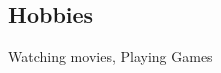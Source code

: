 \documentclass[../main.tex]{subfiles}
\begin{document}
\begin{category}
\section{Hobbies}
    \citembullet  Watching movies, Playing Games
\end{category}
\end{document}
